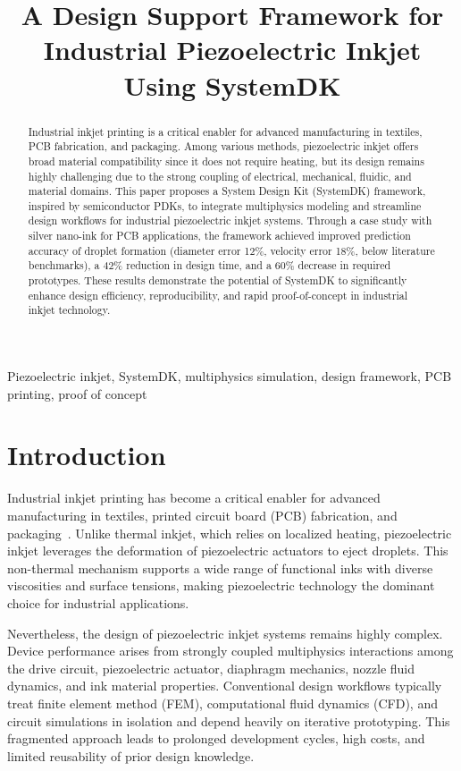 \documentclass[conference]{IEEEtran}
\title{A Design Support Framework for Industrial Piezoelectric Inkjet Using SystemDK}
\author{%
  \IEEEauthorblockN{Shinichi Samizo}
  \IEEEauthorblockA{Independent Semiconductor Researcher\\
  Former Engineer at Seiko Epson Corporation\\
  Email: \href{mailto:shin3t72@gmail.com}{shin3t72@gmail.com}\\
  GitHub: \url{https://github.com/Samizo-AITL}}%
}
\begin{document}
\maketitle

\begin{abstract}
Industrial inkjet printing is a critical enabler for advanced manufacturing in textiles, PCB fabrication, and packaging. 
Among various methods, piezoelectric inkjet offers broad material compatibility since it does not require heating, but its design remains highly challenging due to the strong coupling of electrical, mechanical, fluidic, and material domains. 
This paper proposes a System Design Kit (SystemDK) framework, inspired by semiconductor PDKs, to integrate multiphysics modeling and streamline design workflows for industrial piezoelectric inkjet systems. 
Through a case study with silver nano-ink for PCB applications, the framework achieved improved prediction accuracy of droplet formation (diameter error 12\%, velocity error 18\%, below literature benchmarks), a 42\% reduction in design time, and a 60\% decrease in required prototypes. 
These results demonstrate the potential of SystemDK to significantly enhance design efficiency, reproducibility, and rapid proof-of-concept in industrial inkjet technology.
\end{abstract}

\begin{IEEEkeywords}
Piezoelectric inkjet, SystemDK, multiphysics simulation, design framework, PCB printing, proof of concept
\end{IEEEkeywords}

\section{Introduction}
Industrial inkjet printing has become a critical enabler for advanced manufacturing in textiles, printed circuit board (PCB) fabrication, and packaging~\cite{derby2010,calvert2001}. 
Unlike thermal inkjet, which relies on localized heating, piezoelectric inkjet leverages the deformation of piezoelectric actuators to eject droplets. 
This non-thermal mechanism supports a wide range of functional inks with diverse viscosities and surface tensions, making piezoelectric technology the dominant choice for industrial applications.

Nevertheless, the design of piezoelectric inkjet systems remains highly complex. 
Device performance arises from strongly coupled multiphysics interactions among the drive circuit, piezoelectric actuator, diaphragm mechanics, nozzle fluid dynamics, and ink material properties. 
Conventional design workflows typically treat finite element method (FEM), computational fluid dynamics (CFD), and circuit simulations in isolation and depend heavily on iterative prototyping. 
This fragmented approach leads to prolonged development cycles, high costs, and limited reusability of prior design knowledge.
\end{document}
